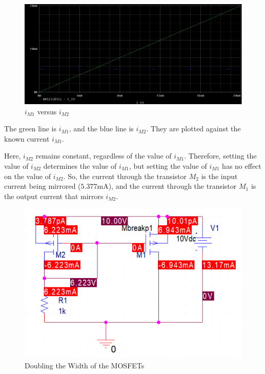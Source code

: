 \FloatBarrier

\FloatBarrier

\begin{figure}[h!]
	\centering
	\includegraphics[scale=0.50]{./images/plot_2.PNG}
	\caption{$i_{M1}$ versus $i_{M2}$}
	\label{fig:plot_2}
\end{figure}

\FloatBarrier

{\footnotesize The green line is $i_{M1}$, and the blue line is $i_{M2}$. They are plotted against the known current $i_{M1}$.}

Here, $i_{M2}$ remains constant, regardless of the value of $i_{M1}$.
Therefore, setting the value of $i_{M2}$ determines the value of $i_{M1}$, but setting the value of $i_{M1}$ has no effect on the value of $i_{M2}$.
So, the current through the transistor $M_2$ is the input current being mirrored ($5.377$\si{\milli\ampere}), and the current through the transistor $M_1$ is the output current that mirrors $i_{M2}$.

\FloatBarrier

\begin{figure}[h!]
	\centering
	\includegraphics[scale=0.75]{./images/double_width_means_double_current.PNG}
	\caption{Doubling the Width of the MOSFETs}
	\label{fig:double_width_means_double_current}
\end{figure}

